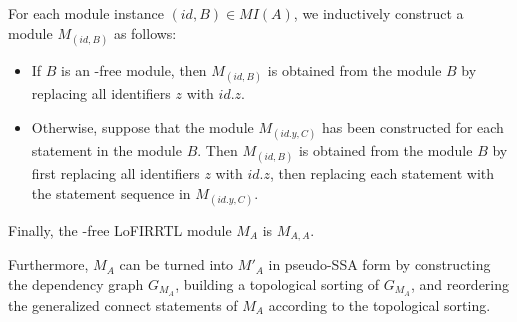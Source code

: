 {For each module instance $(id, B) \in MI(A)$, we inductively construct a module $M_{(id, B)}$ as follows:
\begin{itemize}
\item If $B$ is an -free module, then $M_{(id, B)}$ is obtained from the module $B$ by replacing all identifiers $z$ with $id.z$.
%
\item Otherwise, suppose that the module $M_{(id.y, C)}$ has been constructed for each statement  in the module $B$.
Then $M_{(id, B)}$ is obtained from the module $B$ by first replacing all identifiers $z$ with $id.z$,  then replacing each statement   with the statement sequence in $M_{(id.y, C)}$.
\end{itemize}
Finally, the -free LoFIRRTL module $M_A$ is $M_{A, A}$.

Furthermore, $M_A$ can be turned into $M'_A$ in pseudo-SSA form by constructing the dependency graph $G_{M_A}$, building a topological sorting of $G_{M_A}$, and reordering the generalized connect statements of $M_A$ according to the topological sorting.
}

